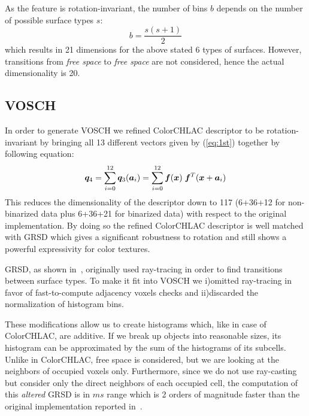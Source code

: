 \documentclass[conference]{sty/IEEEtran}
\begin{document}
As the feature is rotation-invariant, the number of bins $b$ depends on the number of possible 
surface types $s$:
\begin{equation}
b=\frac{s(s+1)}{2}
\end{equation}
which results in 21 dimensions for the above stated 6 types of surfaces. However,
transitions from \emph{free space} to \emph{free space} are not considered, hence
the actual dimensionality is 20.

\subsection{VOSCH}
\label{sec:VOSCH}
In order to generate VOSCH we refined ColorCHLAC descriptor to be rotation-invariant by bringing all  
13 different vectors given by (\ref{eq:1st}) together by following equation: 
\begin{equation}\label{eq:1st_new}
  {\bm q_4} = \sum_{i=0}^{12} {\bm q_3}({\bm a}_i) = \sum_{i=0}^{12} \bm{f}({\bm x}) \hspace{1mm}\bm{f}^T({\bm x}+{\bm a_i}) \\
\end{equation}
%
This reduces the dimensionality of the descriptor down to 117 (6+36+12 for non-binarized data plus 6+36+21 
for binarized data) with respect to the original implementation. 
By doing so the refined ColorCHLAC descriptor is well matched with GRSD which gives a significant 
robustness to rotation and still shows a powerful expressivity for color textures.

GRSD, as shown in~\cite{GRSD10Humanoids}, originally used
ray-tracing in order to find transitions between surface types. To make it fit into VOSCH 
we i)omitted ray-tracing in favor of fast-to-compute adjacency voxels checks and ii)discarded
the normalization of histogram bins.

These modifications allow us to create histograms which, like in case of ColorCHLAC, are additive.
If we break up objects into reasonable sizes, its histogram can be approximated by the sum of the
histograms of its subcells. Unlike in ColorCHLAC, free space is considered, but we are looking
at the neighbors of occupied voxels only. Furthermore, since we do not use ray-casting but 
consider only the direct neighbors of each occupied cell, the computation of this \emph{altered} GRSD is in 
$ms$ range which is 2 orders of magnitude faster than the original implementation
reported in~\cite{GRSD10Humanoids}.
\end{document}
